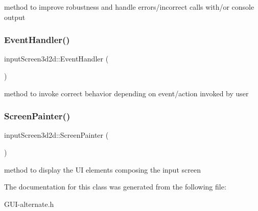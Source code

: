 method to improve robustness and handle errors/incorrect calls with/or console output \mbox{\label{classinput_screen3d2d_a0f023449b6fe3d8b7b981767976129de}} 
\subsubsection{\texorpdfstring{Event\+Handler()}{EventHandler()}}
{\footnotesize\ttfamily input\+Screen3d2d\+::\+Event\+Handler (\begin{DoxyParamCaption}{ }\end{DoxyParamCaption})}

method to invoke correct behavior depending on event/action invoked by user \mbox{\label{classinput_screen3d2d_af0c3df669aff35608d38fd4ef30e31bb}} 
\subsubsection{\texorpdfstring{Screen\+Painter()}{ScreenPainter()}}
{\footnotesize\ttfamily input\+Screen3d2d\+::\+Screen\+Painter (\begin{DoxyParamCaption}{ }\end{DoxyParamCaption})}

method to display the UI elements composing the input screen 

The documentation for this class was generated from the following file\+:\begin{DoxyCompactItemize}
\item 
G\+U\+I-\/alternate.\+h\end{DoxyCompactItemize}
